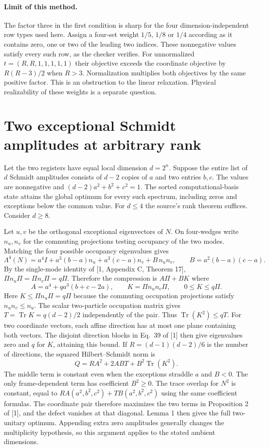 \documentclass[11pt]{article}
\begin{document}
\paragraph{Limit of this method.} The factor three in the first condition is sharp for the four dimension-independent row types used here. Assign a four-set weight $1/5$, $1/8$ or $1/4$ according as it contains zero, one or two of the leading two indices. These nonnegative values satisfy every such row, as the checker verifies. For unnormalized $t=(R,R,1,1,1,1,1)$ their objective exceeds the coordinate objective by $R(R-3)/2$ when $R>3$. Normalization multiplies both objectives by the same positive factor. This is an obstruction to the linear relaxation. Physical realizability of these weights is a separate question.

\section{Two exceptional Schmidt amplitudes at arbitrary rank}
Let the two registers have equal local dimension $d=2^n$. Suppose the entire list of $d$ Schmidt amplitudes consists of $d-2$ copies of $a$ and two entries $b,c$. The values are nonnegative and $(d-2)a^2+b^2+c^2=1$. The sorted computational-basis state attains the global optimum for every such spectrum, including zeros and exceptions below the common value. For $d\le4$ the source's rank theorem suffices. Consider $d\ge8$.

Let $u,v$ be the orthogonal exceptional eigenvectors of $N$. On four-wedges write $n_u,n_v$ for the commuting projections testing occupancy of the two modes. Matching the four possible occupancy eigenvalues gives
\[
 \Lambda^4(N)=a^4 I+a^3(b-a)n_u+a^3(c-a)n_v+B\,n_u n_v,\qquad
 B=a^2(b-a)(c-a).
\]
By the single-mode identity of [1, Appendix C, Theorem 17], $\Pi n_u\Pi=\Pi n_v\Pi=q\Pi$. Therefore the compression is $A\Pi+BK$ where
\[
 A=a^4+qa^3(b+c-2a),\qquad K=\Pi n_u n_v\Pi,\qquad 0\le K\le q\Pi .
\]
Here $K\leq\Pi n_u\Pi=q\Pi$ because the commuting occupation projections satisfy $n_un_v\leq n_u$. The scalar two-particle occupation matrix gives $T=\operatorname{Tr}K=q(d-2)/2$ independently of the pair. Thus $\operatorname{Tr}(K^2)\le qT$. For two coordinate vectors, each affine direction has at most one plane containing both vectors. The disjoint direction blocks in Eq.~39 of [1] then give eigenvalues zero and $q$ for $K$, attaining this bound. If $R=(d-1)(d-2)/6$ is the number of directions, the squared Hilbert--Schmidt norm is
\[
 Q=R A^2+2ABT+B^2\operatorname{Tr}(K^2).
\]
The middle term is constant even when the exceptions straddle $a$ and $B<0$. The only frame-dependent term has coefficient $B^2\ge0$. The trace overlap for $N^2$ is constant, equal to $R A(a^2,b^2,c^2)+T B(a^2,b^2,c^2)$ using the same coefficient formulas. The coordinate pair therefore maximizes the two terms in Proposition 2 of [1], and the defect vanishes at that diagonal. Lemma 1 then gives the full two-unitary optimum. Appending extra zero amplitudes generally changes the multiplicity hypothesis, so this argument applies to the stated ambient dimensions.
\end{document}
